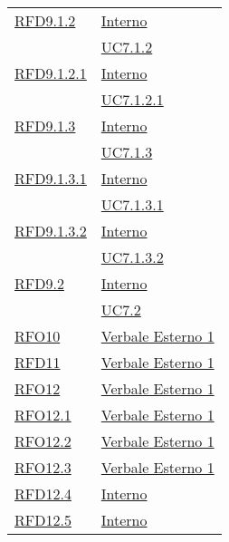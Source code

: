 \begin{longtable}{|>{\centering}m{5cm}|m{5cm}<{\centering}|}
\hyperlink{RFD9.1.2}{RFD9.1.2} & \hyperlink{Interno}{Interno}\\
& \hyperref[UC7.1.2]{UC7.1.2}\\ \hline

\hyperlink{RFD9.1.2.1}{RFD9.1.2.1} & \hyperlink{Interno}{Interno}\\
& \hyperref[UC7.1.2.1]{UC7.1.2.1}\\ \hline

\hyperlink{RFD9.1.3}{RFD9.1.3} & \hyperlink{Interno}{Interno}\\
& \hyperref[UC7.1.3]{UC7.1.3}\\ \hline

\hyperlink{RFD9.1.3.1}{RFD9.1.3.1} & \hyperlink{Interno}{Interno}\\
& \hyperref[UC7.1.3.1]{UC7.1.3.1}\\ \hline

\hyperlink{RFD9.1.3.2}{RFD9.1.3.2} & \hyperlink{Interno}{Interno}\\
& \hyperref[UC7.1.3.2]{UC7.1.3.2}\\ \hline

\hyperlink{RFD9.2}{RFD9.2} & \hyperlink{Interno}{Interno}\\
& \hyperref[UC7.2]{UC7.2}\\ \hline

\hyperlink{RFO10}{RFO10} & \hyperlink{Verbale Esterno 1}{Verbale Esterno 1}\\ \hline

\hyperlink{RFD11}{RFD11} & \hyperlink{Verbale Esterno 1}{Verbale Esterno 1}\\ \hline

\hyperlink{RFO12}{RFO12} & \hyperlink{Verbale Esterno 1}{Verbale Esterno 1}\\ \hline

\hyperlink{RFO12.1}{RFO12.1} & \hyperlink{Verbale Esterno 1}{Verbale Esterno 1}\\ \hline

\hyperlink{RFO12.2}{RFO12.2} & \hyperlink{Verbale Esterno 1}{Verbale Esterno 1}\\ \hline

\hyperlink{RFO12.3}{RFO12.3} & \hyperlink{Verbale Esterno 1}{Verbale Esterno 1}\\ \hline

\hyperlink{RFD12.4}{RFD12.4} & \hyperlink{Interno}{Interno}\\ \hline

\hyperlink{RFD12.5}{RFD12.5} & \hyperlink{Interno}{Interno}\\ \hline


\end{longtable}

